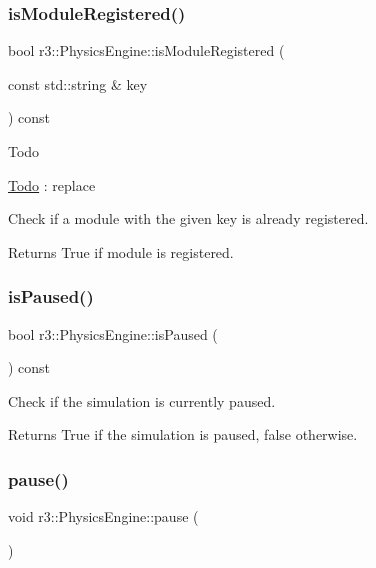 \subsubsection{\texorpdfstring{is\+Module\+Registered()}{isModuleRegistered()}}
{\footnotesize\ttfamily bool r3\+::\+Physics\+Engine\+::is\+Module\+Registered (\begin{DoxyParamCaption}\item[{const std\+::string \&}]{key }\end{DoxyParamCaption}) const}

\begin{DoxyRefDesc}{Todo}
\item[\mbox{\hyperlink{todo__todo000005}{Todo}}]\+: replace \end{DoxyRefDesc}
Check if a module with the given key is already registered. \begin{DoxyReturn}{Returns}
True if module is registered. 
\end{DoxyReturn}
\mbox{\label{classr3_1_1_physics_engine_a8978c7f4626cb0c69a79456c304323d2}} 
\subsubsection{\texorpdfstring{is\+Paused()}{isPaused()}}
{\footnotesize\ttfamily bool r3\+::\+Physics\+Engine\+::is\+Paused (\begin{DoxyParamCaption}{ }\end{DoxyParamCaption}) const}



Check if the simulation is currently paused. 

\begin{DoxyReturn}{Returns}
True if the simulation is paused, false otherwise. 
\end{DoxyReturn}
\mbox{\label{classr3_1_1_physics_engine_a6ed605620a6f115f014d3940dc2a5487}} 
\subsubsection{\texorpdfstring{pause()}{pause()}}
{\footnotesize\ttfamily void r3\+::\+Physics\+Engine\+::pause (\begin{DoxyParamCaption}{ }\end{DoxyParamCaption})}



